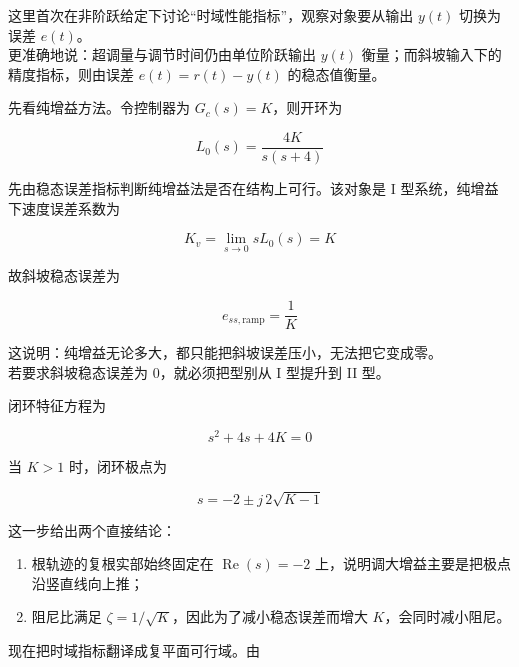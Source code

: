 \documentclass[
  11pt]{article}
\providecommand{\tightlist}{%
  \setlength{\itemsep}{0pt}\setlength{\parskip}{0pt}}
\begin{document}
这里首次在非阶跃给定下讨论``时域性能指标''，观察对象要从输出 \(y(t)\)
切换为误差 \(e(t)\)。\\
更准确地说：超调量与调节时间仍由单位阶跃输出 \(y(t)\)
衡量；而斜坡输入下的精度指标，则由误差 \(e(t)=r(t)-y(t)\) 的稳态值衡量。

先看纯增益方法。令控制器为 \(G_c(s)=K\)，则开环为

\begin{equation}
L_0(s)=\frac{4K}{s(s+4)}
\tag{3-7-29}\label{eq:3-7-pure-gain}
\end{equation}

先由稳态误差指标判断纯增益法是否在结构上可行。该对象是 I
型系统，纯增益下速度误差系数为

\begin{equation}
K_v=\lim_{s\to 0}sL_0(s)=K
\tag{3-7-32}\label{eq:3-7-pure-gain-kv}
\end{equation}

故斜坡稳态误差为

\begin{equation}
e_{ss,\mathrm{ramp}}=\frac{1}{K}
\tag{3-7-33}\label{eq:3-7-pure-gain-ramp-error}
\end{equation}

这说明：纯增益无论多大，都只能把斜坡误差压小，无法把它变成零。\\
若要求斜坡稳态误差为 0，就必须把型别从 I 型提升到 II 型。

闭环特征方程为

\begin{equation}
s^2+4s+4K=0
\tag{3-7-30}\label{eq:3-7-pure-gain-char}
\end{equation}

当 \(K>1\) 时，闭环极点为

\begin{equation}
s=-2\pm j\,2\sqrt{K-1}
\tag{3-7-31}\label{eq:3-7-pure-gain-poles}
\end{equation}

这一步给出两个直接结论：

\begin{enumerate}
\def\labelenumi{\arabic{enumi}.}
\tightlist
\item
  根轨迹的复根实部始终固定在 \(\operatorname{Re}(s)=-2\)
  上，说明调大增益主要是把极点沿竖直线向上推；
\item
  阻尼比满足 \(\zeta=1/\sqrt{K}\)，因此为了减小稳态误差而增大
  \(K\)，会同时减小阻尼。
\end{enumerate}

现在把时域指标翻译成复平面可行域。由
\end{document}
